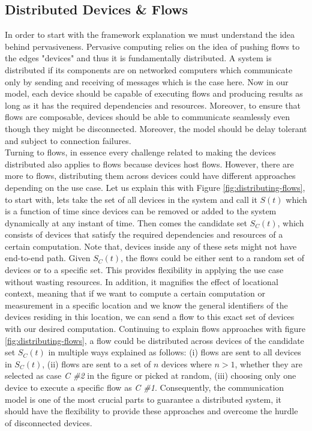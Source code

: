\subsection{Distributed Devices \& Flows}
In order to start with the framework explanation we must understand the idea behind pervasiveness. Pervasive computing relies on the idea of pushing flows to the edges "devices" and thus it is fundamentally distributed. A system is distributed if its components  are on networked computers which communicate only by sending and receiving of messages \cite{DSYS} which is the case here. Now in our model, each device should be capable of executing flows and producing results as long as it has the required dependencies and resources. Moreover, to ensure that flows are composable, devices should be able to communicate seamlessly even though they might be disconnected. Moreover, the model should be delay tolerant and subject to connection failures.\\



\noindent Turning to flows, in essence every challenge related to making the devices distributed also applies to flows because devices host flows. However, there are more to flows, distributing them across devices could have different approaches depending on the use case. Let us explain this with Figure \ref{fig:distributing-flows}, to start with, lets take the set of all devices in the system and call it \(S(t)\) which is a function of time since devices can be removed or added to the system dynamically at any instant of time. Then comes the candidate set \(S_C(t)\), which consists of devices that satisfy the required dependencies and resources of a certain computation. Note that, devices inside any of these sets might not have end-to-end path. Given \(S_C(t)\), the flows could be either sent to a random set of devices or to a specific set. This provides flexibility in applying the use case without wasting resources. In addition, it magnifies the effect of locational context, meaning that if we want to compute a certain computation or measurement in a specific location  and we know the general identifiers of  the  devices residing in this location, we can send a flow to this exact set of devices with our desired computation. Continuing to explain flows approaches with figure \ref{fig:distributing-flows}, a flow could be distributed across devices of the candidate set  \(S_C(t)\) in multiple ways explained as follows: (i) flows are sent to all devices in  \(S_C(t)\), (ii) flows are sent to a set of  \(n\)  devices where \(n > 1\), whether they are selected as case \textit{C \#2} in the figure or picked at random, (iii) choosing only one device to execute a specific flow as \textit{C \#1}. Consequently, the communication model is one of the most crucial parts to guarantee a distributed system, it should have the flexibility to provide these approaches and overcome the hurdle of disconnected devices.
 
